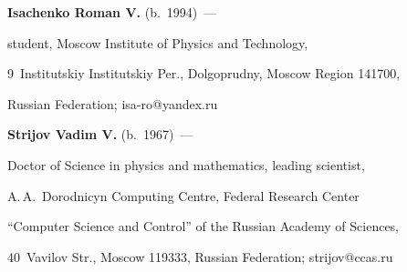 \noindent


\textbf{Isachenko Roman V.} (b.\ 1994)~---


 student, Moscow Institute of Physics and Technology, 


 9~Institutskiy Institutskiy Per., Dolgoprudny, Moscow Region 141700, 


 Russian Federation;   \mbox{isa-ro@yandex.ru}














\vspace*{3pt}





\noindent


\textbf{Strijov Vadim V.} (b.\ 1967)~---


Doctor of Science in physics and mathematics, leading scientist, 


A.\,A.~Dorodnicyn Computing Centre, Federal Research Center 


``Computer Science and Control'' of the Russian Academy of Sciences, 


40~Vavilov Str., Moscow 119333, Russian Federation; \mbox{strijov@ccas.ru}








\label{end\stat}








\renewcommand{\bibname}{\protect\rm Литература}



